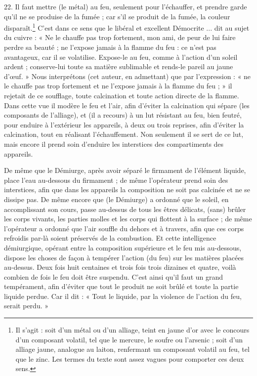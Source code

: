 \documentclass[landscape, a4paper, 11pt, oneside, polutonikogreek, french]{article}
\begin{document}
22. Il faut mettre (le métal) au feu, seulement pour l'échauffer, et prendre garde qu'il ne se produise de la fumée ; car s'il se produit de la fumée, la couleur disparaît.\footnote{Il s'agit : soit d'un métal ou d'un alliage, teint en jaune d'or avec le concours d'un composant volatil, tel que le mercure, le soufre ou l'arsenic ; soit d'un alliage jaune, analogue au laiton, renfermant un composant volatil au feu, tel que le zinc. Les termes du texte sont assez vagues pour comporter ces deux sens.} C'est dans ce sens que le libéral et excellent Démocrite ... dit au sujet du cuivre : « Ne le chauffe pas trop fortement, mon ami, de peur de lui faire perdre sa beauté ; ne l'expose jamais à la flamme du feu : ce n'est pas avantageux, car il se volatilise. Expose-le au feu, comme à l'action d'un soleil ardent ; conserve-lui toute sa matière sublimable et rends-le pareil au jaune d'œuf. » Nous interprétons (cet auteur, en admettant) que par l'expression : « ne le chauffe pas trop fortement et ne l'expose jamais à la flamme du feu ; » il rejetait de ce soufflage, toute calcination et toute action directe de la flamme. Dans cette vue il modère le feu et l'air, afin d'éviter la calcination qui sépare (les composants de l'alliage), et (il a recours) à un lut résistant au feu, bien feutré, pour enduire à l'extérieur les appareils, à deux ou trois reprises, afin d'éviter la calcination, tout en réalisant l'échauffement. Non seulement il se sert de ce lut, mais encore il prend soin d'enduire les interstices des compartiments des appareils.

De même que le Démiurge, après avoir séparé le firmament de l'élément liquide, place l'eau au-dessous du firmament ; de même l'opérateur prend soin des interstices, afin que dans les appareils la composition ne soit pas calcinée et ne se dissipe pas. De même encore que (le Démiurge) a ordonné que le soleil, en accomplissant son cours, passe au-dessus de tous les êtres délicats, (sans) brûler les corps vivants, les parties molles et les corps qui flottent à la surface ; de même l'opérateur a ordonné que l'air souffle du dehors et à travers, afin que ces corps refroidis par-là soient préservés de la combustion. Et cette intelligence démiurgique, opérant entre la composition supérieure et le feu mis au-dessous, dispose les choses de façon à tempérer l'action (du feu) sur les matières placées au-dessus. Deux fois huit centaines et trois fois trois dizaines et quatre, voilà combien de fois le feu doit être suspendu. C'est ainsi qu'il faut un grand tempérament, afin d'éviter que tout le produit ne soit brûlé et toute la partie liquide perdue. Car il dit : « Tout le liquide, par la violence de l'action du feu, serait perdu. »
\end{document}
